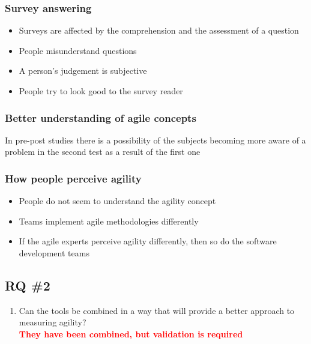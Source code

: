 \clearpage

\subsubsection{Survey answering}

\begin{itemize}
	\item Surveys are affected by the comprehension and the assessment of a question \cite{Wagner_Zeglovits}
	\item People misunderstand questions
	\item A person's judgement is subjective
	\item People try to look good to the survey reader \cite{feldt_angelis_torkar_samuelsson}
\end{itemize}

\clearpage

\subsubsection{Better understanding of agile concepts}

In pre-post studies there is a possibility of the subjects becoming more aware of a problem in the second test as a result of the first one

\clearpage

\subsubsection{How people perceive agility}

\begin{itemize}
	\item People do not seem to understand the agility concept
	\item Teams implement agile methodologies differently
	\item If the agile experts perceive agility differently, then so do the software development teams
\end{itemize}

\clearpage

\subsection{RQ \#2}

\begin{enumerate}
	\setcounter{enumi}{\theenumTemp}
	\item Can the tools be combined in a way that will provide a better approach to measuring agility? \\ \textcolor{red}{\textbf{They have been combined, but validation is required}}
\end{enumerate}

\clearpage